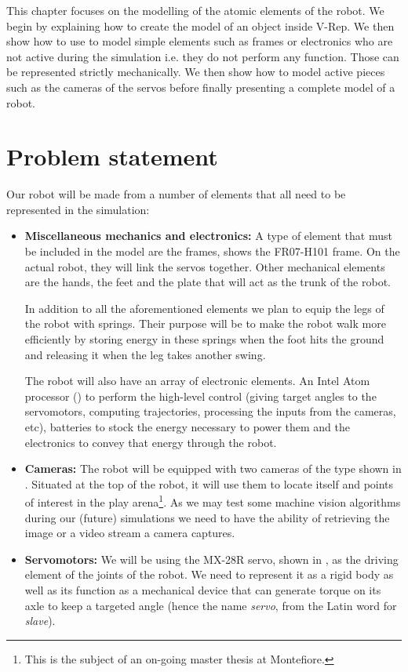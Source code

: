 This chapter focuses on the modelling of the atomic elements of the robot. We begin by explaining how to create the model of an object inside V-Rep. We then show how to use to model simple elements such as frames or electronics who are not active during the simulation i.e. they do not perform any function. Those can be represented strictly mechanically. We then show how to model active pieces such as the cameras of the servos before finally presenting a complete model of a robot.

\section{Problem statement}
Our robot will be made from a number of elements that all need to be represented in the simulation:\begin{itemize}
\item \textbf{Miscellaneous mechanics and electronics:} A type of element that must be included in the model are the frames,  shows the FR07-H101 frame. On the actual robot, they will link the servos together. Other mechanical elements are the hands, the feet and the plate that will act as the trunk of the robot. 

In addition to all the aforementioned elements we plan to equip the legs of the robot with springs. Their purpose will be to make the robot walk more efficiently by storing energy in these springs when the foot hits the ground and releasing it when the leg takes another swing.

The robot will also have an array of electronic elements. An Intel Atom processor () to perform the high-level control (giving target angles to the servomotors, computing trajectories, processing the inputs from the cameras, etc),  batteries to stock the energy necessary to power them and the electronics to convey that energy through the robot.

\item \textbf{Cameras:} The robot will be equipped with two cameras of the type shown in . Situated at the top of the robot, it will use them to locate itself and points of interest in the play arena\footnote{This is the subject of an on-going master thesis at Montefiore.}. As we may test some machine vision algorithms during our (future) simulations we need to have the ability of retrieving the image or a video stream a camera captures.

\item \textbf{Servomotors:} We will be using the MX-28R servo, shown in , as the driving element of the joints of the robot. We need to represent it as a rigid body as well as its function as a mechanical device that can generate torque on its axle to keep a targeted angle (hence the name \emph{servo}, from the Latin word for \emph{slave}).
\end{itemize}

